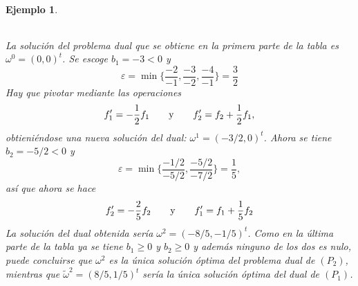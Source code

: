 \documentclass[11pt]{report}
\theoremstyle{mytheorem}
\theoremstyle{mydefinition}
\theoremstyle{myexample}
\newtheorem*{example}{Ejemplo}
\begin{document}
\begin{example}
\begin{center}
\begin{tabular}{|c|c|c|c|c|c|c|}
    \cline{2-7}
\end{tabular}
\end{center}
La solución del problema dual que se obtiene en la primera parte de la tabla es $\omega^0 = (0,0)^t$. Se escoge $b_1 = -3<0$ y 
\[\varepsilon = \min\biggl\{\frac{-2}{-1},\frac{-3}{-2},\frac{-4}{-1}\biggr\} = \frac{3}{2}\]
Hay que pivotar mediante las operaciones
\[f_1'=-\frac{1}{2}f_1 \qquad \textup{y} \qquad f_2' = f_2+\frac{1}{2}f_1,\]
obtieniéndose una nueva solución del dual: $\omega^1 = (-3/2,0)^t$. Ahora se tiene $b_2 = -5/2 <0$ y
\[\varepsilon = \min \biggl\{\frac{-1/2}{-5/2},\frac{-5/2}{-7/2}\biggr\} = \frac{1}{5},\]
así que ahora se hace
\[f_2'=-\frac{2}{5}f_2 \qquad \textup{y} \qquad f_1' = f_1+\frac{1}{5}f_2\]
La solución del dual obtenida sería $\omega^2=(-8/5,-1/5)^t$. Como en la última parte de la tabla ya se tiene $b_1\geq 0$ y $b_2\geq 0$ y además ninguno de los dos es nulo, puede concluirse que $\omega^2$ es la única solución óptima del problema dual de $(P_2)$, mientras que $\tilde{\omega}^2 = (8/5,1/5)^t$ sería la única solución óptima del dual de $(P_1)$.

\end{example}
\end{document}
